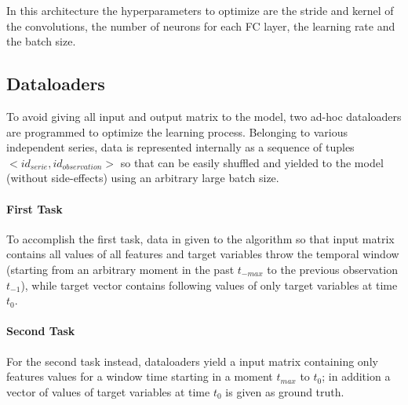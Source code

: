 In this architecture the hyperparameters to optimize are the stride and kernel of the convolutions, the number of neurons for each FC layer, the learning rate and the batch size.

\subsection{Dataloaders}
To avoid giving all input and output matrix to the model, two ad-hoc dataloaders are programmed to optimize the learning process.
Belonging to various independent series, data is represented internally as a sequence of tuples $<id_{serie}, id_{observation}>$ so that can be easily shuffled and yielded to the model (without side-effects) using an arbitrary large batch size.

\paragraph{First Task}
To accomplish the first task, data in given to the algorithm so that input matrix contains all values of all features and target variables throw the temporal window (starting from an arbitrary moment in the past $t_{-max}$ to the previous observation $t_{-1}$), while target vector contains following values of only target variables at time $t_0$.

\paragraph{Second Task}
For the second task instead, dataloaders yield a input matrix containing only features values for a window time starting in a moment $t_{max}$ to $t_0$; in addition a vector of values of target variables at time $t_0$ is given as ground truth.



